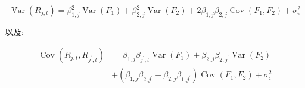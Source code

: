 \documentclass[letterpaper]{article}
\begin{document}
$$
\operatorname{Var}\left (R_{j, t}\right) =\beta_{1, j}^{2} \operatorname{Var}\left (F_{1}\right) +\beta_{2, j}^{2} \operatorname{Var}\left (F_{2}\right) +2 \beta_{1, j} \beta_{2, j} \operatorname{Cov}\left (F_{1}, F_{2}\right) +\sigma_{\epsilon}^{2}
$$

以及: 

$$
\begin{aligned}
\operatorname{Cov}\left (R_{j, t}, R_{j^{\prime}, t}\right) & =\beta_{1, j} \beta_{j^{\prime}, t} \operatorname{Var}\left (F_{1}\right) +\beta_{2, j} \beta_{2, j^{\prime}} \operatorname{Var}\left (F_{2}\right) \\
& +\left (\beta_{1, j} \beta_{2, j^{\prime}}+\beta_{2, j} \beta_{1, j^{\prime}}\right) \operatorname{Cov}\left (F_{1}, F_{2}\right) +\sigma_{\epsilon}^{2}
\end{aligned}
$$
\end{document}
